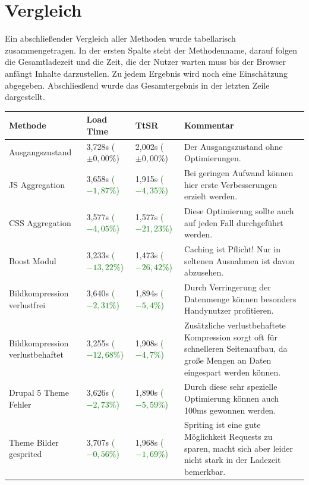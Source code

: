 \section{Vergleich}
Ein abschlie\ss{}ender Vergleich aller Methoden wurde tabellarisch zusammengetragen. In der ersten Spalte steht der Methodenname, darauf folgen die Gesamtladezeit und die Zeit, die der Nutzer warten muss bis der Browser anf\"angt Inhalte darzustellen. Zu jedem Ergebnis wird noch eine Einsch\"atzung abgegeben. Abschlies\ss{}end wurde das Gesamtergebnis in der letzten Zeile dargestellt.
\begin{table}
\centering
\caption{Auswertung der Ergebnisse}
    \begin{longtable}{ | p{3cm} | p{1.5cm} | p{1.5cm} | p{6cm} |}
 
    \hline
    Methode & Load Time & TtSR & Kommentar \\ \hline
    \hline
    Ausgangszustand 			& 3,728s ($\pm0,00\%$)  				& 2,002s ($\pm0,00\%$) & Der Ausgangszustand ohne Optimierungen. \\ \hline
    JS Aggregation 			& 3,658s \textcolor{green}{($-1,87\%$)}  	& 1,915s \textcolor{green}{($-4,35\%$)} & Bei geringen Aufwand können hier erste Verbesserungen erzielt werden. \\ \hline
    CSS Aggregation 			& 3,577s \textcolor{green}{($-4,05\%$)} 	& 1,577s \textcolor{green}{($-21,23\%$)}& Diese Optimierung sollte auch auf jeden Fall durchgeführt werden. \\ \hline
    Boost Modul 			& 3,233s \textcolor{green}{($-13,22\%$)} 	& 1,473s \textcolor{green}{($-26,42\%$)}& Caching ist Pflicht! Nur in seltenen Ausnahmen ist davon abzusehen. \\ \hline
    Bildkompression verlustfrei 	& 3,640s \textcolor{green}{($-2,31\%$)} 	& 1,894s \textcolor{green}{($-5,4\%$)}& Durch Verringerung der Datenmenge können besonders Handynutzer profitieren.  \\ \hline
    Bildkompression verlustbehaftet 	& 3,255s \textcolor{green}{($-12,68\%$)} 	& 1,908s \textcolor{green}{($-4,7\%$)}& Zusätzliche verlustbehaftete Kompression sorgt oft für schnelleren Seitenaufbau, da große Mengen an Daten eingespart werden können.  \\ \hline
    Drupal 5 Theme Fehler 		& 3,626s \textcolor{green}{($-2,73\%$)} 	& 1,890s \textcolor{green}{($-5,59\%$)}& Durch diese sehr spezielle Optimierung können auch 100ms gewonnen werden.  \\ \hline
    Theme Bilder gesprited 		& 3,707s \textcolor{green}{($-0,56\%$)} 	& 1,968s \textcolor{green}{($-1,69\%$)}& Spriting ist eine gute Möglichkeit Requests zu sparen, macht sich aber leider nicht stark in der Ladezeit bemerkbar.  \\ \hline

\end{longtable}
\end{table}
